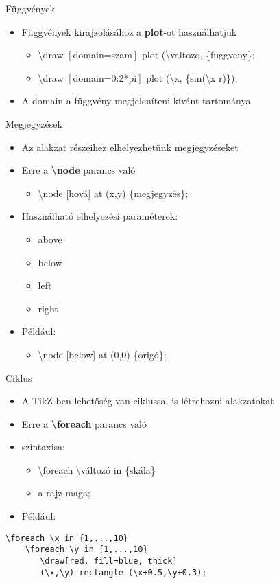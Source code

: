 \documentclass[11pt]{beamer}
\newcommand{\tbs}{\textbackslash}
\begin{document}
\begin{frame}{Függvények}
\begin{itemize}
\item Függvények kirajzolásához a \textbf{plot}-ot használhatjuk
	\begin{itemize}
	\item \tbs draw $\left[\right.$domain=szam$\left.\right]$ plot (\tbs valtozo, \{fuggveny\};
	\item \tbs draw $\left[\right.$domain=0:2*pi$\left.\right]$ plot (\tbs x, \{sin(\tbs x r)\});
	\end{itemize}
\item A domain a függvény megjeleníteni kívánt tartománya
\end{itemize}
\end{frame}

\begin{frame}{Megjegyzések}
\begin{itemize}
\item Az alakzat részeihez elhelyezhetünk megjegyzéseket
\item Erre a \textbf{\tbs node} parancs való
	\begin{itemize}
	\item \tbs node [hová] at (x,y) \{megjegyzés\};
	\end{itemize}
\item Használható elhelyezési paraméterek:
	\begin{itemize}
	\item above
	\item below
	\item left
	\item right
	\end{itemize}
\item Például:
	\begin{itemize}
	\item \tbs node [below] at (0,0) \{origó\};
	\end{itemize}
\end{itemize}
\end{frame}

\begin{frame}[fragile]{Ciklus}
\begin{itemize}
\item A TikZ-ben lehetőség van ciklussal is létrehozni alakzatokat
\item Erre a \textbf{\tbs foreach} parancs való
\item szintaxisa:
	\begin{itemize}
	\item \tbs foreach \tbs változó in \{skála\}
	\item a rajz maga;
	\end{itemize}
\item Például:
\end{itemize}

\begin{verbatim}
\foreach \x in {1,...,10}
	\foreach \y in {1,...,10}
       \draw[red, fill=blue, thick] 
       (\x,\y) rectangle (\x+0.5,\y+0.3);
\end{verbatim}
\end{frame}
\end{document}
